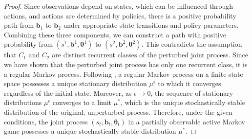 \documentclass[a4paper,12pt]{report}
\begin{document}
\begin{proof}
    Since observations depend on states, which can be influenced through actions,
    and actions are determined by policies, there is a positive probability path from
    $\boldsymbol{b}_{1}$ to $\boldsymbol{b}_{2}$ under appropriate state transitions
    and policy parameters. Combining these three components, we can construct a path
    with positive probability from $(s^{1}, \boldsymbol{b}^{1}, \boldsymbol{\theta}
        ^{1})$ to $(s^{2}, \boldsymbol{b}^{2}, \boldsymbol{\theta}^{2})$. This
    contradicts the assumption that $C_{1}$ and $C_{2}$ are distinct recurrent
    classes of the perturbed joint process. Since we have shown that the perturbed
    joint process has only one recurrent class, it is a regular Markov process. Following
    \citep{kim2022influencing,wicks2012algorithmcomputingstochasticallystable}, a regular Markov
    process on a finite state space possesses a unique stationary distribution
    $\mu^{\epsilon}$ to which it converges regardless of the initial state. Moreover,
    as $\epsilon \to 0$, the sequence of stationary distributions $\mu^{\epsilon}$
    converges to a limit $\mu^{*}$, which is the unique stochastically stable
    distribution of the original, unperturbed process. Therefore, under the given conditions,
    the joint process $(s_{t}, \boldsymbol{b}_{t}, \boldsymbol{\theta}_{t})$ in a
    partially observable active Markov game possesses a unique stochastically
    stable distribution $\mu^{*}$.
\end{proof}
\end{document}
